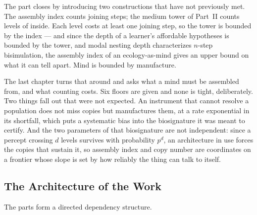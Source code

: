 \documentclass[12pt,openright,twoside]{book}
\theoremstyle{remark}
\theoremstyle{plain}
\theoremstyle{remark}
\theoremstyle{plain}
\theoremstyle{plain}
\begin{document}
The part closes by introducing two constructions that have not previously
met.
The assembly index counts joining steps; the medium tower of Part~II
counts levels of inside.
Each level costs at least one joining step, so the tower is bounded by
the index --- and since the depth of a learner's affordable hypotheses is
bounded by the tower, and modal nesting depth characterizes $n$-step
bisimulation, the assembly index of an ecology-as-mind gives an upper
bound on what it can tell apart.
Mind is bounded by manufacture.

The last chapter turns that around and asks what a mind must be
assembled from, and what counting costs.
Six floors are given and none is tight, deliberately.
Two things fall out that were not expected.
An instrument that cannot resolve a population does not miss copies but
manufactures them, at a rate exponential in its shortfall, which puts a
systematic bias into the biosignature it was meant to certify.
And the two parameters of that biosignature are not independent: since a
percept crossing $d$ levels survives with probability $p^{d}$, an
architecture in use forces the copies that sustain it, so assembly index
and copy number are coordinates on a frontier whose slope is set by how
reliably the thing can talk to itself.

\bigskip

\subsection*{The Architecture of the Work}

The parts form a directed dependency structure.
\end{document}
